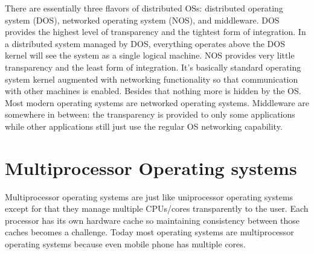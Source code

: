 \documentclass[twoside]{article}
\begin{document}
There are essentially three flavors of distributed OSs: distributed operating system (DOS), networked operating system (NOS), and middleware. DOS provides the highest level of transparency and the tightest form of integration. In a distributed system managed by DOS, everything operates above the DOS kernel will see the system as a single logical machine. NOS provides very little transparency and the least form of integration. It's basically standard operating system kernel augmented with networking functionality so that communication with other machines is enabled. Besides that nothing more is hidden by the OS. Most modern operating systems are networked operating systems. Middleware are somewhere in between: the transparency is provided to only some applications while other applications still just use the regular OS networking capability.

\section{Multiprocessor Operating systems}

Multiprocessor operating systems are just like uniprocessor operating systems except for that they manage multiple CPUs/cores transparently to the user. Each processor has its own hardware cache so maintaining consistency between those caches becomes a challenge. Today most operating systems are multiprocessor operating systems because even mobile phone has multiple cores.
\end{document}
